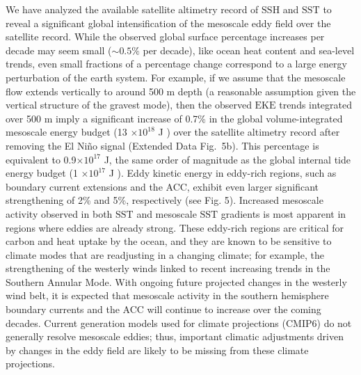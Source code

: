 \documentclass{nature}
\newcommand{\EKE}{\text{EKE}}
\newcommand{\SST}{\text{SST}}
\newcommand{\SSH}{\text{SSH}}
\begin{document}
We have analyzed the available satellite altimetry record of $\SSH$ and $\SST$ to reveal a significant global intensification of the mesoscale eddy field over the satellite record. While the observed global surface percentage increases per decade may seem small ($\sim0.5\%$ per decade), like ocean heat content and sea-level trends, even small fractions of a percentage change correspond to a large energy perturbation of the earth system. For example, if we assume that the mesoscale flow extends vertically to around 500 m depth (a reasonable assumption given the vertical structure of the gravest mode\cite{Lama_Vmodes_2016}), then the observed $\EKE$ trends integrated over 500 m imply a significant increase of 0.7\% in the global volume-integrated mesoscale energy budget (13 $\times10^{18}$ J \cite{Wunsch_energy_2004}) over the satellite altimetry record after removing the El Ni\~no signal (Extended Data Fig.~5b). This percentage is equivalent to 0.9$\times10^{17}$ J, the same order of magnitude as the global internal tide energy budget (1 $\times10^{17}$ J \cite{Wunsch_energy_2004}). Eddy kinetic energy in eddy-rich regions, such as boundary current extensions and the ACC, exhibit even larger significant strengthening of 2\% and 5\%, respectively (see Fig. 5). Increased mesoscale activity observed in both $\SST$ and mesoscale $\SST$ gradients is most apparent in regions where eddies are already strong. These eddy-rich regions are critical for carbon and heat uptake by the ocean\cite{Foppert_Eddy_2017,Gnanadesikan_carbon_uptake_2015}, and they are known to be sensitive to climate modes that are readjusting in a changing climate; for example, the strengthening of the westerly winds\cite{Hogg_Recent_2015} linked to recent increasing trends in the Southern Annular Mode\cite{Nerilie_SAM_2014,Gillett_SAM_2013}. With ongoing future projected changes in the westerly wind belt, it is expected that mesoscale activity in the southern hemisphere boundary currents and the ACC will continue to increase over the coming decades. Current generation models used for climate projections (CMIP6) do not generally resolve mesoscale eddies\cite{Haarsma_CMIP6_2016}; thus, important climatic adjustments driven by changes in the eddy field are likely to be missing from these climate projections.
\end{document}
